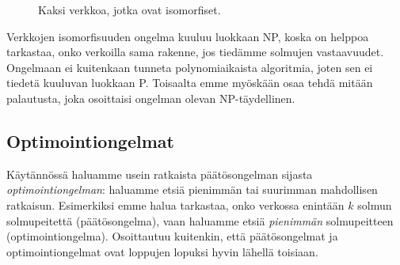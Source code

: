 \begin{figure}
\center
\begin{center}
\end{center}
\caption{Kaksi verkkoa, jotka ovat isomorfiset.}
\label{fig:veriso}
\end{figure}

Verkkojen isomorfisuuden ongelma kuuluu luokkaan NP,
koska on helppoa tarkastaa, onko verkoilla sama rakenne,
jos tiedämme solmujen vastaavuudet.
Ongelmaan ei kuitenkaan tunneta polynomiaikaista algoritmia,
joten sen ei tiedetä kuuluvan luokkaan P.
Toisaalta emme myöskään osaa tehdä mitään palautusta,
joka osoittaisi ongelman olevan NP-täydellinen.

\subsection{Optimointiongelmat}


Käytännössä haluamme usein ratkaista päätösongelman
sijasta \emph{optimointiongelman}: haluamme etsiä pienimmän
tai suurimman mahdollisen ratkaisun.
Esimerkiksi emme halua tarkastaa, onko verkossa
enintään $k$ solmun solmupeitettä (päätösongelma),
vaan haluamme etsiä \emph{pienimmän} solmupeitteen (optimointiongelma).
Osoittautuu kuitenkin, että päätösongelmat ja optimointiongelmat
ovat loppujen lopuksi hyvin lähellä toisiaan.

